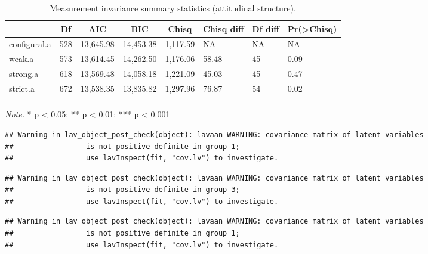 \documentclass[
  english,
  man]{apa6}
\begin{document}
\begin{table}[tbp]

\begin{center}
\begin{threeparttable}

\caption{\label{tab:measinv.pilot.att}Measurement invariance summary statistics (attitudinal structure).}

\begin{tabular}{llllllll}
\toprule
 & \multicolumn{1}{c}{Df} & \multicolumn{1}{c}{AIC} & \multicolumn{1}{c}{BIC} & \multicolumn{1}{c}{Chisq} & \multicolumn{1}{c}{Chisq diff} & \multicolumn{1}{c}{Df diff} & \multicolumn{1}{c}{Pr(>Chisq)}\\
\midrule
configural.a & 528 & 13,645.98 & 14,453.38 & 1,117.59 & NA & NA & NA\\
weak.a & 573 & 13,614.45 & 14,262.50 & 1,176.06 & 58.48 & 45 & 0.09\\
strong.a & 618 & 13,569.48 & 14,058.18 & 1,221.09 & 45.03 & 45 & 0.47\\
strict.a & 672 & 13,538.35 & 13,835.82 & 1,297.96 & 76.87 & 54 & 0.02\\
\bottomrule
\addlinespace
\end{tabular}

\begin{tablenotes}[para]
\normalsize{\textit{Note.} * p < 0.05; ** p < 0.01; *** p < 0.001}
\end{tablenotes}

\end{threeparttable}
\end{center}

\end{table}

\begin{verbatim}
## Warning in lav_object_post_check(object): lavaan WARNING: covariance matrix of latent variables
##                 is not positive definite in group 1;
##                 use lavInspect(fit, "cov.lv") to investigate.
\end{verbatim}

\begin{verbatim}
## Warning in lav_object_post_check(object): lavaan WARNING: covariance matrix of latent variables
##                 is not positive definite in group 3;
##                 use lavInspect(fit, "cov.lv") to investigate.
\end{verbatim}

\begin{verbatim}
## Warning in lav_object_post_check(object): lavaan WARNING: covariance matrix of latent variables
##                 is not positive definite in group 1;
##                 use lavInspect(fit, "cov.lv") to investigate.
\end{verbatim}
\end{document}
